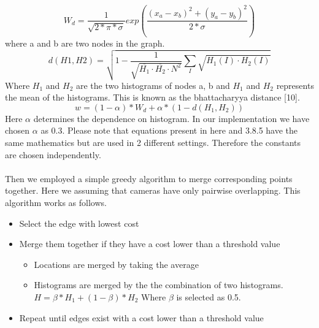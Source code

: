 \documentclass[12pt,a4paper]{report}
\begin{document}
\begin{equation}
\label{eqn:multicam1}
W_d = \frac{1}{\sqrt{2*\pi* \sigma }}exp\left (\frac{(x_a-x_b)^2+ (y_a-y_b)^2}{2*\sigma }\right )
\end{equation}
where a and b are two nodes in the graph.
\begin{equation}
\label{eqn:multicam2}
d(H1,H2)=\sqrt{1-\frac{1}{\sqrt{\overline{H_1}\cdot \overline{H_2}\cdot N^2}}\sum_{I}^{ }\sqrt{H_1(I)\cdot H_2(I)}}
\end{equation}
Where $H_1$ and $H_2$ are the two histograms of nodes a, b and $H_1$ and $H_2$  represents the mean of the histograms. This is known as the bhattacharyya distance [10].
\begin{equation}
\label{eqn:multicam3}
w = (1-\alpha)*W_d + \alpha*(1-d(H_1,H_2))
\end{equation}
Here $\alpha$ determines the dependence on histogram. In our implementation we have chosen $\alpha$ as 0.3. Please note that equations present in here and 3.8.5 have the same mathematics but are used in 2 different settings. Therefore the constants are chosen independently.\\\\
Then we employed a simple greedy algorithm to merge corresponding points together. Here we assuming that cameras have only pairwise overlapping. This algorithm works as follows.
\begin{itemize}
\item Select the edge with lowest cost
\item Merge them together if they have a cost lower than a threshold value
\begin{itemize}
\item Locations are merged by taking the average
\item Histograms are merged by the the combination of two histograms.\\
$H = \beta*H_1 + (1- \beta) * H_2$ Where $\beta$ is selected as 0.5.

\end{itemize}
\item Repeat until edges exist with a cost lower than a threshold value
\end{itemize}
\end{document}
